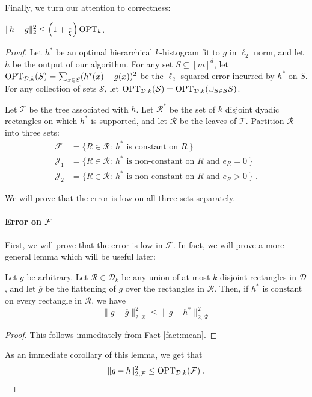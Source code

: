 \documentclass[final,12pt]{colt2018} %
\newcommand{\flatten}[1]{\overline{#1}}
\newcommand{\rect}{\mathcal{R}}
\newcommand{\hier}{\mathcal{D}}
\newcommand{\calT}{\mathcal{T}}
\newcommand{\calF}{\mathcal{F}}
\newcommand{\calJ}{\mathcal{J}}
\newcommand{\calS}{\mathcal{S}}
\begin{document}
Finally, we turn our attention to correctness:
\begin{lemma}
\label{lem:correctness-l2}
$\| h - g \|_2^2 \leq  \left( 1 + \frac{1}{\xi} \right) \mathrm{OPT}_k$.
\end{lemma}
\begin{proof}
Let $h^*$ be an optimal hierarchical $k$-histogram fit to $g$ in $\ell_2$ norm, and let $h$ be the output of our algorithm.
For any set $S \subseteq [m]^d$, let $\OPT_{\hier, k} (S) = \sum_{x \in S} (h^* (x) - g(x))^2$ be the $\ell_2$-squared error incurred by $h^*$ on $S$.
For any collection of sets $\calS$, let $\OPT_{\hier, k} (\calS ) = \OPT_{\hier, k} (\cup_{S \in \calS} S)$.

Let $\calT$ be the tree associated with $h$.
Let $\rect^*$ be the set of $k$ disjoint dyadic rectangles on which $h^*$ is supported, and let $\rect$ be the leaves of $\calT$.
Partition $\rect$ into three sets: 
\begin{align*}
\calF &= \{ R \in \rect: ~\mbox{$h^*$ is constant on $R$}~\} \\
\calJ_1 &= \{ R \in \rect: ~\mbox{$h^*$ is non-constant on $R$ and $e_R = 0$}~\} \\
\calJ_2 &= \{ R \in \rect: ~\mbox{$h^*$ is non-constant on $R$ and $e_R > 0$}~\} \; .
\end{align*}

\noindent
We will prove that the error is low on all three sets separately.

\paragraph{Error on $\cal{F}$}
First, we will prove that the error is low in $\calF$.
In fact, we will prove a more general lemma which will be useful later:
\begin{lemma}
\label{lem:flat-err-l2}
Let $g$ be arbitrary.
Let $\rect \in \hier_k$ be any union of at most $k$ disjoint rectangles in $\hier$, and let $\flatten{g}$ be the flattening of $g$ over the rectangles in $\rect$.
Then, if $h^*$ is constant on every rectangle in $\rect$, we have
\[
\| g - \flatten{g} \|_{2, \rect}^2 \leq \| g - h^* \|_{2, \rect}^2
\]
\end{lemma}
\begin{proof}
This follows immediately from Fact \ref{fact:mean}.
\end{proof}
\noindent
As an immediate corollary of this lemma, we get that
\begin{equation}
\label{eq:err-F-l2}
\| g - h \|_{2, \calF}^2 \leq \OPT_{\hier, k} (\calF) \; .
\end{equation}


\end{proof}
\end{document}
